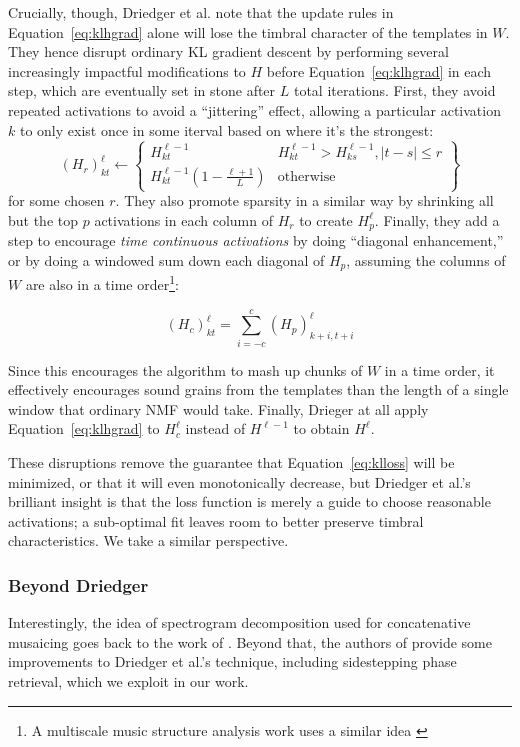 \documentclass{article}
\begin{document}
Crucially, though, Driedger et al. note that the update rules in Equation~\ref{eq:klhgrad} alone will lose the timbral character of the templates in $W$.  They hence disrupt ordinary KL gradient descent by performing several increasingly impactful modifications to $H$ before Equation~\ref{eq:klhgrad} in each step, which are eventually set in stone after $L$ total iterations.  First, they avoid repeated activations to avoid a ``jittering'' effect, allowing a particular activation $k$ to only exist once in some iterval based on where it's the strongest:
\begin{equation}
    \label{eq:driedgerrepeated}
    (H_r)_{kt}^{\ell} \gets \left\{ \begin{array}{cc} H^{\ell-1}_{kt} & H^{\ell-1}_{kt} > H^{\ell-1}_{ks}, |t - s| \leq r \\ H^{\ell-1}_{kt} (1 - \frac{\ell+1}{L}) & \text{otherwise}  \end{array} \right\}
\end{equation}
for some chosen $r$.  They also promote sparsity in a similar way by shrinking all but the top $p$ activations in each column of $H_r$ to create $H_p^{\ell}$.  Finally, they add a step to encourage {\em time continuous activations} by doing ``diagonal enhancement,'' or by doing a windowed sum down each diagonal of $H_p$, assuming the columns of $W$ are also in a time order\footnote{A multiscale music structure analysis work uses a similar idea \cite{mcfee2014analyzing}}:

\begin{equation}
    \label{eq:driedgertimecontinuous}
    (H_c)_{kt}^{\ell} = \sum_{i=-c}^c (H_p)^{\ell}_{k+i, t+i}
\end{equation}

Since this encourages the algorithm to mash up chunks of $W$ in a time order, it effectively encourages sound grains from the templates than the length of a single window that ordinary NMF would take.  Finally, Drieger at all apply Equation~\ref{eq:klhgrad} to $H_c^{\ell}$ instead of $H^{\ell-1}$ to obtain $H^{\ell}$.

These disruptions remove the guarantee that Equation~\ref{eq:klloss} will be minimized, or that it will even monotonically decrease, but Driedger et al.'s brilliant insight is that the loss function is merely a guide to choose reasonable activations; a sub-optimal fit leaves room to better preserve timbral characteristics.  We take a similar perspective.



\subsubsection{Beyond Driedger}
Interestingly, the idea of spectrogram decomposition used for concatenative musaicing goes back to the work of \cite{burred2013cross}.  Beyond that, the authors of \cite{buch2017nichtnegativematrixfaktorisierungnutzendesklangsynthesensystem} provide some improvements to Driedger et al.'s technique, including sidestepping phase retrieval, which we exploit in our work.
\end{document}
